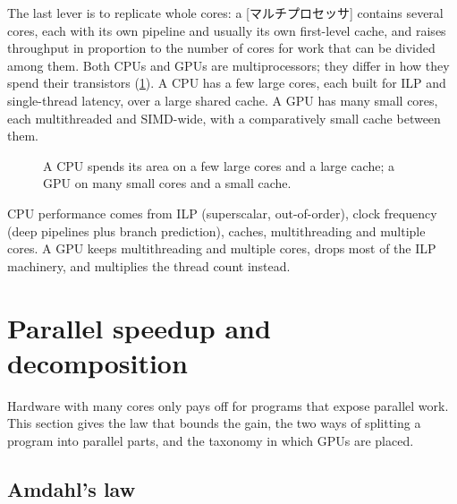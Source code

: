 \documentclass[../main.tex]{subfiles}
\begin{document}
The last lever is to replicate whole cores: a
[マルチプロセッサ] contains several cores, each
with its own pipeline and usually its own first-level cache, and raises
throughput in proportion to the number of cores for work that can be
divided among them.  Both CPUs and GPUs are multiprocessors; they differ
in how they spend their transistors (\cref{fig:l01-cpu-vs-gpu}).  A CPU
has a few large cores, each built for ILP and single-thread latency,
over a large shared cache.  A GPU has many small cores, each
multithreaded and SIMD-wide, with a comparatively small cache between
them.

\begin{figure}[htbp]
  \centering
  
  \caption{A CPU spends its area on a few large cores and a large cache;
    a GPU on many small cores and a small cache.}
  \label{fig:l01-cpu-vs-gpu}
\end{figure}

\begin{keypoint}
  CPU performance comes from ILP (superscalar, out-of-order), clock
  frequency (deep pipelines plus branch prediction), caches,
  multithreading and multiple cores.  A GPU keeps multithreading and
  multiple cores, drops most of the ILP machinery, and multiplies the
  thread count instead.
\end{keypoint}

\section{Parallel speedup and decomposition}
\label{sec:l01-parallel-programs}

Hardware with many cores only pays off for programs that expose parallel
work.  This section gives the law that bounds the gain, the two ways of
splitting a program into parallel parts, and the taxonomy in which GPUs
are placed.

\subsection{Amdahl's law}
\end{document}
